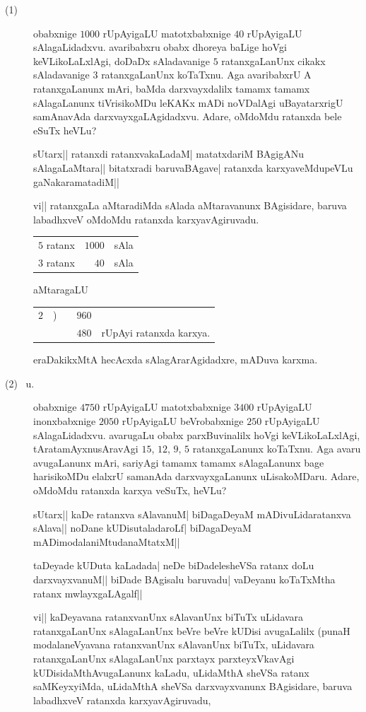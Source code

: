\begin{description}
\item[\rm(1)] obabxnige $1000$ rUpAyigaLU matotxbabxnige $40$
rUpAyigaLU sAlagaLidadxvu. avaribabxru obabx dhoreya baLige hoVgi
keVLikoLaLxlAgi, doDaDx sAladavanige $5$ ratanxgaLanUnx cikakx
sAladavanige $3$ ratanxgaLanUnx koTaTxnu. Aga avaribabxrU A
ratanxgaLanunx mAri, baMda darxvayxdalilx tamamx tamamx sAlagaLanunx
tiVrisikoMDu leKAKx mADi noVDalAgi uBayatarxrigU samAnavAda
darxvayxgaLAgidadxvu. Adare, oMdoMdu ratanxda bele eSuTx heVLu?

sUtarx|| ratanxdi ratanxvakaLadaM| matatxdariM BAgigANu
sAlagaLaMtara|| bitatxradi baruvaBAgave| ratanxda karxyaveMdu\-peVLu
gaNakaramatadiM|| 

vi|| ratanxgaLa aMtaradiMda sAlada aMtaravanunx BAgisidare, baruva
labadhxveV oMdoMdu ratanxda karxyavAgiruvadu.
\begin{center}
\begin{tabular}{lrl}
$5$ ratanx & $1000$ & sAla\\[2pt]
$3$ ratanx & $40$ & sAla
\end{tabular}
\end{center}
aMtaragaLU
\begin{center}
\begin{tabular}{rl@{\kern -4pt}ll}
\cline{3-3}
$2$ & ) & ~~$960$ &\\[3pt]
\cline{3-3}
    &   & ~~$480$ & rUpAyi ratanxda karxya.
\end{tabular}
\end{center}
eraDakikxMtA hecAcxda sAlagArarAgidadxre, mADuva karxma.

\item[{\rm(2)}~ u.]
obabxnige $4750$ rUpAyigaLU matotxbabxnige $3400$ rUpAyigaLU
inonxbabxnige $2050$ rUpAyigaLU beVrobabxnige $250$ rUpAyigaLU
sAlagaLidadxvu. avarugaLu obabx parxBuvinalilx hoVgi keVLikoLaLxlAgi,
tAratamAyxnusAravAgi $15$, $12$, $9$, $5$ ratanxgaLanunx koTaTxnu. Aga
avaru avugaLanunx mAri, sariyAgi tamamx tamamx sAlagaLanunx bage
harisikoMDu elalxrU samanAda darxvayxgaLanunx uLisakoMDaru. Adare,
oMdoMdu ratanxda karxya veSuTx, heVLu?

sUtarx|| kaDe ratanxva sAlavanuM| biDagaDeyaM mADivuLidaratanxva
sAlava|| noDane kUDisutaladaroLf| biDagaDeyaM
mADimodalaniMtudanaMtatxM||

taDeyade kUDuta kaLadada| neDe biDadelesheVSa ratanx doLu
darxvayxvanuM|| biDade BAgisalu baruvadu| vaDeyanu koTaTxMtha ratanx
mwlayxgaLAgalf|| 

vi|| kaDeyavana ratanxvanUnx sAlavanUnx biTuTx uLidavara
ratanxgaLanUnx sAlagaLanUnx beVre beVre kUDisi avugaLalilx (punaH
modalaneVyavana ratanxvanUnx sAlavanUnx biTuTx, uLidavara
ratanxgaLanUnx sAlagaLanUnx parxtayx parxteyxVkavAgi
kUDisidaMthAvugaLanunx kaLadu, uLidaMthA sheVSa ratanx saMKeyxyiMda,
uLidaMthA sheVSa darxvayxvanunx BAgisidare, baruva labadhxveV ratanxda
karxyavAgiruvadu,
\end{description}

